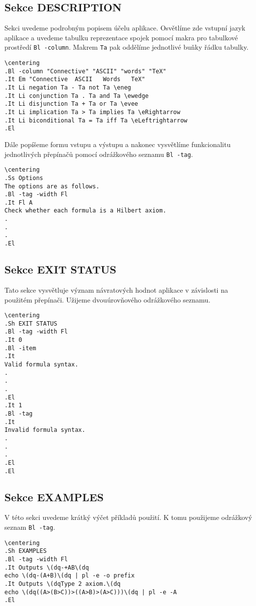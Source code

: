 \documentclass[thesis=B,czech,hidelinks]{FITthesis}[2012/06/26]
\begin{document}
\subsection{Sekce DESCRIPTION}

Sekci uvedeme podrobným popisem účelu aplikace. Osvětlíme zde vstupní jazyk aplikace a uvedeme tabulku reprezentace spojek pomocí makra pro tabulkové prostředí \texttt{Bl -column}. Makrem \texttt{Ta} pak oddělíme jednotlivé buňky řádku tabulky.

\begin{verbatim}
\centering
.Bl -column "Connective" "ASCII" "words" "TeX"
.It Em "Connective	ASCII	Words	TeX"
.It Li negation Ta - Ta not Ta \eneg
.It Li conjunction Ta . Ta and Ta \ewedge
.It Li disjunction Ta + Ta or Ta \evee
.It Li implication Ta > Ta implies Ta \eRightarrow
.It Li biconditional Ta = Ta iff Ta \eLeftrightarrow
.El
\end{verbatim}

Dále popíšeme formu vstupu a výstupu a nakonec vysvětlíme funkcionalitu jednotlivých přepínačů pomocí odrážkového seznamu \texttt{Bl -tag}.

\begin{verbatim}
\centering
.Ss Options
The options are as follows.
.Bl -tag -width Fl
.It Fl A
Check whether each formula is a Hilbert axiom.
.
.
.
.El
\end{verbatim}

\subsection{Sekce EXIT STATUS}

Tato sekce vysvětluje význam návratových hodnot aplikace v závislosti na použitém přepínači. Užijeme dvouúrovňového odrážkového seznamu.

\begin{verbatim}
\centering
.Sh EXIT STATUS
.Bl -tag -width Fl
.It 0
.Bl -item
.It
Valid formula syntax.
.
.
.
.El
.It 1
.Bl -tag
.It
Invalid formula syntax.
.
.
.
.El
.El
\end{verbatim}

\subsection{Sekce EXAMPLES}

V této sekci uvedeme krátký výčet příkladů použití. K tomu použijeme odrážkový seznam \texttt{Bl -tag}.

\begin{verbatim}
\centering
.Sh EXAMPLES
.Bl -tag -width Fl
.It Outputs \(dq-+AB\(dq
echo \(dq-(A+B)\(dq | pl -e -o prefix
.It Outputs \(dqType 2 axiom.\(dq
echo \(dq((A>(B>C))>((A>B)>(A>C)))\(dq | pl -e -A
.El
\end{verbatim}
\end{document}
